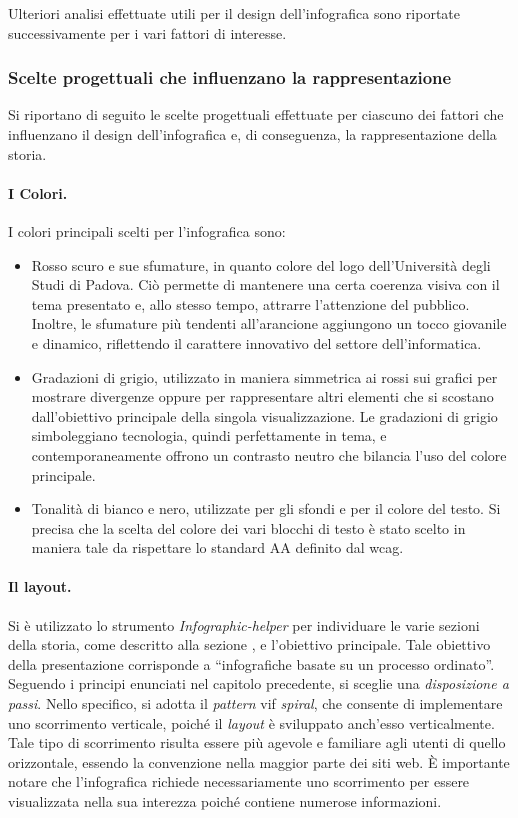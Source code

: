 Ulteriori analisi effettuate utili per il design dell'infografica sono riportate successivamente per i vari fattori di interesse.

\subsubsection{Scelte progettuali che influenzano la rappresentazione}
Si riportano di seguito le scelte progettuali effettuate per ciascuno dei fattori che influenzano il design dell'infografica
e, di conseguenza, la rappresentazione della storia.

\paragraph{I Colori.} I colori principali scelti per l'infografica sono:
\begin{itemize}
    \item Rosso scuro e sue sfumature, in quanto colore del logo dell'Università degli Studi di Padova. Ciò permette di mantenere una certa coerenza visiva con il
    tema presentato e, allo stesso tempo, attrarre l'attenzione del pubblico. Inoltre, le sfumature più tendenti all'arancione aggiungono un tocco giovanile e dinamico,
    riflettendo il carattere innovativo del settore dell'informatica.
    \item Gradazioni di grigio, utilizzato in maniera simmetrica ai rossi sui grafici per mostrare divergenze oppure per rappresentare altri elementi che si scostano 
    dall'obiettivo principale della singola visualizzazione. 
    Le gradazioni di grigio simboleggiano tecnologia, quindi perfettamente in tema, e contemporaneamente offrono un contrasto neutro che bilancia l'uso del colore 
    principale.
    \item Tonalità di bianco e nero, utilizzate per gli sfondi e per il colore del testo. 
    Si precisa che la scelta del colore dei vari blocchi di testo è stato scelto in maniera tale da rispettare lo standard AA definito dal \gls{wcag}.
\end{itemize}

\paragraph{Il layout.}
Si è utilizzato lo strumento \emph{Infographic-helper} per individuare le varie sezioni della storia, come descritto alla sezione , e l'obiettivo principale. 
Tale obiettivo della presentazione corrisponde a ``infografiche basate su un processo ordinato''. Seguendo i principi enunciati nel capitolo precedente, si sceglie una \emph{disposizione 
a passi}. Nello specifico, si adotta il \emph{pattern} \gls{vif} \emph{spiral}, che consente di implementare uno scorrimento verticale, poiché il \emph{layout} è sviluppato anch'esso verticalmente.  
Tale tipo di scorrimento risulta essere più agevole e familiare agli utenti di quello orizzontale, essendo la convenzione nella maggior parte dei siti web. 
È importante notare che l'infografica richiede necessariamente uno scorrimento per essere visualizzata nella sua interezza poiché contiene numerose informazioni.

